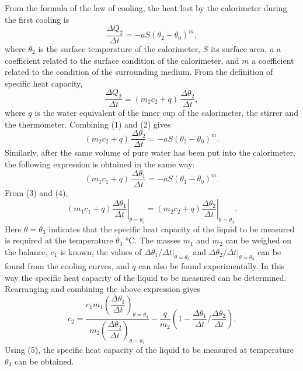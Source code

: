 From the formula of the law of cooling, the heat lost by the calorimeter during the first cooling is
\begin{equation}\tag{1}
\frac{\Delta Q_2}{\Delta t}=-aS(\theta_2-\theta_0)^{m},
\end{equation}
where $\theta_2$ is the surface temperature of the calorimeter, $S$ its surface area, $a$ a coefficient related to the surface condition of the calorimeter, and $m$ a coefficient related to the condition of the surrounding medium. From the definition of specific heat capacity,
\begin{equation}\tag{2}
\frac{\Delta Q_2}{\Delta t}=(m_2c_2+q)\,\frac{\Delta\theta_2}{\Delta t},
\end{equation}
where $q$ is the water equivalent of the inner cup of the calorimeter, the stirrer and the thermometer. Combining (1) and (2) gives
\begin{equation}\tag{3}
(m_2c_2+q)\,\frac{\Delta\theta_2}{\Delta t}=-aS(\theta_2-\theta_0)^{m}.
\end{equation}
Similarly, after the same volume of pure water has been put into the calorimeter, the following expression is obtained in the same way:
\begin{equation}\tag{4}
(m_1c_1+q)\,\frac{\Delta\theta_1}{\Delta t}=-aS(\theta_1-\theta_0)^{m}.
\end{equation}
From (3) and (4),
\begin{equation*}
(m_1c_1+q)\left.\frac{\Delta\theta_1}{\Delta t}\right|_{\theta=\theta_3}
=(m_2c_2+q)\left.\frac{\Delta\theta_2}{\Delta t}\right|_{\theta=\theta_3}.
\end{equation*}
Here $\theta=\theta_3$ indicates that the specific heat capacity of the liquid to be measured is required at the temperature $\theta_3$ \si{\celsius}. The masses $m_1$ and $m_2$ can be weighed on the balance, $c_1$ is known, the values of $\left.\Delta\theta_1/\Delta t\right|_{\theta=\theta_3}$ and $\left.\Delta\theta_2/\Delta t\right|_{\theta=\theta_3}$ can be found from the cooling curves, and $q$ can also be found experimentally. In this way the specific heat capacity of the liquid to be measured can be determined. Rearranging and combining the above expression gives
\begin{equation}\tag{5}
c_2=\frac{c_1m_1\left(\dfrac{\Delta\theta_1}{\Delta t}\right)_{\theta=\theta_3}}
{m_2\left(\dfrac{\Delta\theta_2}{\Delta t}\right)_{\theta=\theta_3}}
-\frac{q}{m_2}\left(1-\frac{\Delta\theta_1}{\Delta t}\Big/\frac{\Delta\theta_2}{\Delta t}\right).
\end{equation}
Using (5), the specific heat capacity of the liquid to be measured at temperature $\theta_3$ can be obtained.


